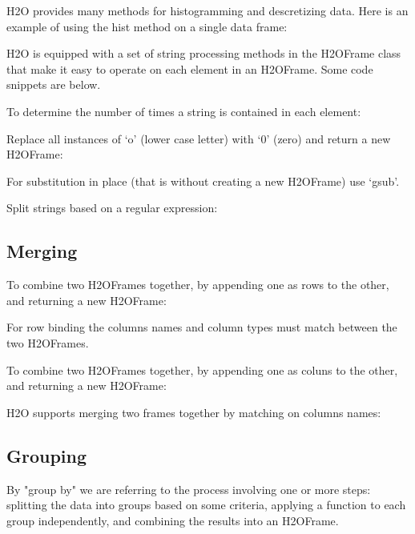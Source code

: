 H2O provides many methods for histogramming and descretizing data.
Here is an example of using the hist method on a single data frame:


H2O is equipped with a set of string processing methods in the H2OFrame class
that make it easy to operate on each element in an H2OFrame.  Some code snippets are below.

To determine the number of times a string is contained in each element:


Replace all instances of `o' (lower case letter) with `0' (zero) and return a new H2OFrame:


For substitution in place (that is without creating a new H2OFrame) use `gsub'.

Split strings based on a regular expression:



\subsection{Merging}
To combine two H2OFrames together, by appending one as rows to the other, and returning a new H2OFrame:


For row binding the columns names and column types must match between the two H2OFrames.

To combine two H2OFrames together, by appending one as coluns to the other,
and returning a new H2OFrame:


H2O supports merging two frames together by matching on columns names:


\subsection{Grouping}
By "group by" we are referring to the process involving one or more steps: splitting the
data into groups based on some criteria, applying a function to each group independently,
and combining the results into an H2OFrame.

